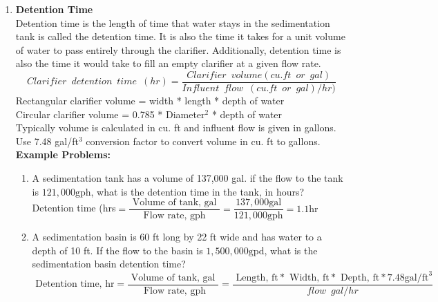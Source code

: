 \begin{enumerate}
\begin{enumerate}[1.]
\end{enumerate}
\item \textbf{Detention Time}\\
Detention time is the length of time that water stays in the sedimentation tank is called the detention time.  It is also the time it takes for a unit volume of water to pass entirely through the clarifier.  Additionally, detention time is also the time it would take to fill an empty clarifier at a given flow rate.\\
$$Clarifier \enspace detention \enspace time \enspace (hr) = 	\dfrac{ Clarifier \enspace volume (cu.ft \enspace or \enspace gal)}{Influent \enspace flow \enspace (cu.ft \enspace or \enspace gal)/hr)}$$
Rectangular clarifier volume = width * length * depth of water\\
Circular clarifier volume = 0.785 * Diameter$^2$ * depth of water\\
Typically volume is calculated in cu. ft and influent flow is given in gallons.  Use 7.48 gal/ft$^3$ conversion factor to convert volume in cu. ft to gallons.\\

\vspace{0.2cm}
\textbf{Example Problems:}\\
\begin{enumerate}[1.]
\item A sedimentation tank has a volume of 137,000 gal. if the flow to the tank is $121,000 \mathrm{gph}$, what is the detention time in the tank, in hours?\\
\vspace{0.2cm}
Detention time (hrs$=\dfrac{\text { Volume of tank, gal }}{\text { Flow rate, gph }}=\dfrac{137,000 \mathrm{gal}}{121,000 \mathrm{gph}} = \boxed{1.1 \mathrm{hr}}$\\
\vspace{0.2cm}
\item A sedimentation basin is 60 ft long by 22 ft wide and has water to a depth of 10 ft. If the flow to the basin is $1,500,000 \mathrm{gpd}$, what is the sedimentation basin detention time?\\
\vspace{0.2cm}
$\text { Detention time, } \mathrm{hr}=\dfrac{\text { Volume of tank, gal }}{\text { Flow rate, } \mathrm{gph}}=\dfrac{\text { Length, } \mathrm{ft} * \text { Width, } \mathrm{ft} * \text { Depth, } \mathrm{ft} * 7.48 \mathrm{gal} / \mathrm{ft}^{3}}{flow \enspace gal/hr}$


\end{enumerate}
\end{enumerate}
